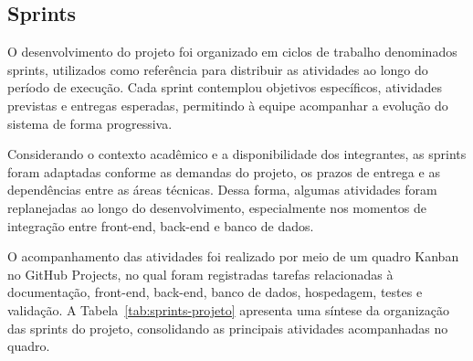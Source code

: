 \subsection{Sprints}

O desenvolvimento do projeto foi organizado em ciclos de trabalho denominados sprints, utilizados como referência para distribuir as atividades ao longo do período de execução. Cada sprint contemplou objetivos específicos, atividades previstas e entregas esperadas, permitindo à equipe acompanhar a evolução do sistema de forma progressiva.

Considerando o contexto acadêmico e a disponibilidade dos integrantes, as sprints foram adaptadas conforme as demandas do projeto, os prazos de entrega e as dependências entre as áreas técnicas. Dessa forma, algumas atividades foram replanejadas ao longo do desenvolvimento, especialmente nos momentos de integração entre front-end, back-end e banco de dados.

O acompanhamento das atividades foi realizado por meio de um quadro Kanban no GitHub Projects, no qual foram registradas tarefas relacionadas à documentação, front-end, back-end, banco de dados, hospedagem, testes e validação. A Tabela~\ref{tab:sprints-projeto} apresenta uma síntese da organização das sprints do projeto, consolidando as principais atividades acompanhadas no quadro.

